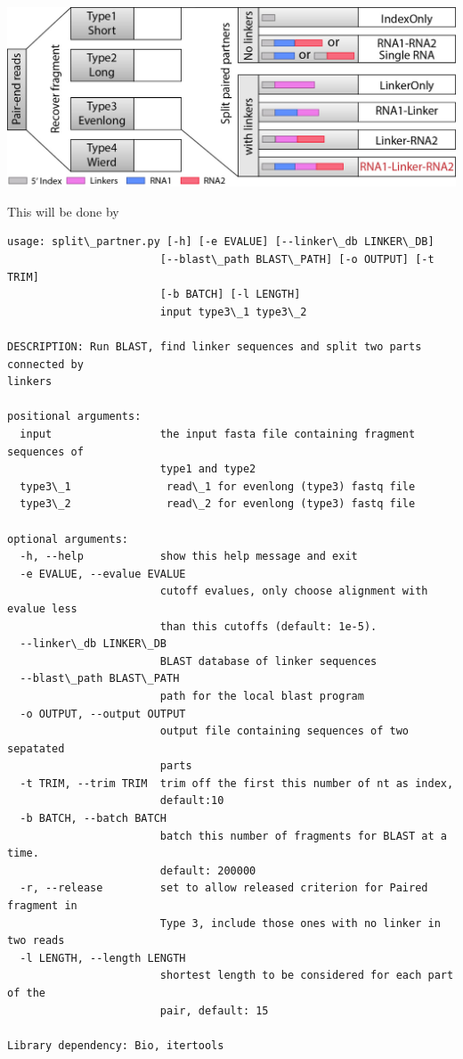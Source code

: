 \documentclass[letterpaper,10pt,english]{sphinxmanual}
\begin{document}
{\hfill\includegraphics{summary.jpg}\hfill}

This will be done by 

\begin{Verbatim}[commandchars=\\\{\}]
usage: split\_partner.py [-h] [-e EVALUE] [--linker\_db LINKER\_DB]
                        [--blast\_path BLAST\_PATH] [-o OUTPUT] [-t TRIM]
                        [-b BATCH] [-l LENGTH]
                        input type3\_1 type3\_2

DESCRIPTION: Run BLAST, find linker sequences and split two parts connected by
linkers

positional arguments:
  input                 the input fasta file containing fragment sequences of
                        type1 and type2
  type3\_1               read\_1 for evenlong (type3) fastq file
  type3\_2               read\_2 for evenlong (type3) fastq file

optional arguments:
  -h, --help            show this help message and exit
  -e EVALUE, --evalue EVALUE
                        cutoff evalues, only choose alignment with evalue less
                        than this cutoffs (default: 1e-5).
  --linker\_db LINKER\_DB
                        BLAST database of linker sequences
  --blast\_path BLAST\_PATH
                        path for the local blast program
  -o OUTPUT, --output OUTPUT
                        output file containing sequences of two sepatated
                        parts
  -t TRIM, --trim TRIM  trim off the first this number of nt as index,
                        default:10
  -b BATCH, --batch BATCH
                        batch this number of fragments for BLAST at a time.
                        default: 200000
  -r, --release         set to allow released criterion for Paired fragment in
                        Type 3, include those ones with no linker in two reads
  -l LENGTH, --length LENGTH
                        shortest length to be considered for each part of the
                        pair, default: 15

Library dependency: Bio, itertools
\end{Verbatim}
\end{document}
